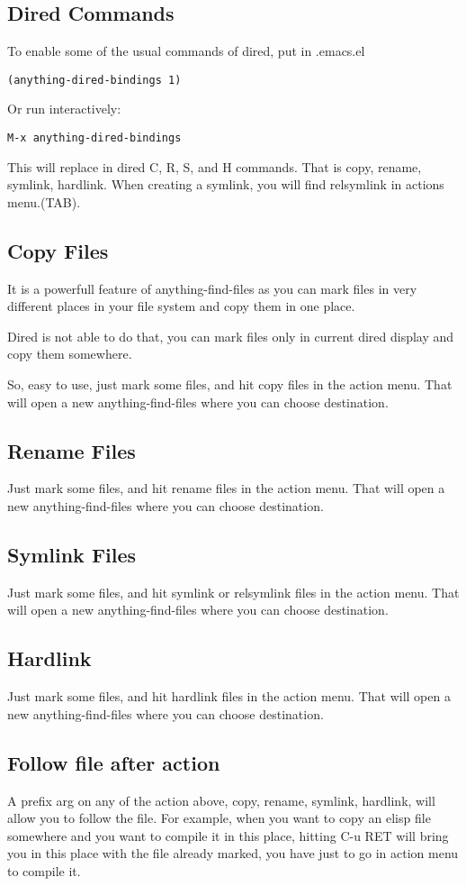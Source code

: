\documentclass[a4paper,11pt]{article}
\begin{document}
\subsection{Dired Commands}
\label{sec:dired-commands}
To enable some of the usual commands of dired, put in .emacs.el
\begin{verbatim}
(anything-dired-bindings 1)
\end{verbatim}
Or run interactively:
\begin{verbatim}
M-x anything-dired-bindings
\end{verbatim}
This will replace in dired C, R, S, and H commands.
That is copy, rename, symlink, hardlink.
When creating a symlink, you will find relsymlink in actions menu.(TAB).

\subsection{Copy Files}
\label{sec:copy-files}
It is a powerfull feature of anything-find-files as you can mark files in very different places in your
file system and copy them in one place.

Dired is not able to do that, you can mark files only in current dired display and copy them somewhere.

So, easy to use, just mark some files, and hit copy files in the action menu.
That will open a new anything-find-files where you can choose destination.
\subsection{Rename Files}
\label{sec:rename-files}
Just mark some files, and hit rename files in the action menu.
That will open a new anything-find-files where you can choose destination.
\subsection{Symlink Files}
\label{sec:symlink-files}
Just mark some files, and hit symlink or relsymlink files in the action menu.
That will open a new anything-find-files where you can choose destination.
\subsection{Hardlink}
\label{sec:hardlink}
Just mark some files, and hit hardlink files in the action menu.
That will open a new anything-find-files where you can choose destination.

\subsection{Follow file after action}
\label{sec:follow-file-after}
A prefix arg on any of the action above, copy, rename, symlink, hardlink, will
allow you to follow the file.
For example, when you want to copy an elisp file somewhere and you want to compile it in this place,
hitting C-u RET will bring you in this place with the file already marked, you have just to go in action menu to
compile it.  
\end{document}
